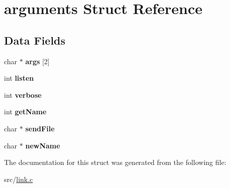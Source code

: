\hypertarget{structarguments}{}\section{arguments Struct Reference}
\label{structarguments}
\subsection*{Data Fields}
\begin{DoxyCompactItemize}
\item 
\hypertarget{structarguments_af17bdefc5e5a3d025f8f7cd9ac23b338}{}\label{structarguments_af17bdefc5e5a3d025f8f7cd9ac23b338} 
char $\ast$ {\bfseries args} \mbox{[}2\mbox{]}
\item 
\hypertarget{structarguments_a1656f07e9c1192c8a50c886a818ee8a1}{}\label{structarguments_a1656f07e9c1192c8a50c886a818ee8a1} 
int {\bfseries listen}
\item 
\hypertarget{structarguments_af26be46c71f5dceb1a990d05b926c7ec}{}\label{structarguments_af26be46c71f5dceb1a990d05b926c7ec} 
int {\bfseries verbose}
\item 
\hypertarget{structarguments_ae07d1497bbc944e8425443e698de60c6}{}\label{structarguments_ae07d1497bbc944e8425443e698de60c6} 
int {\bfseries get\+Name}
\item 
\hypertarget{structarguments_a89841ea8312d2413358efc516e9f9fa4}{}\label{structarguments_a89841ea8312d2413358efc516e9f9fa4} 
char $\ast$ {\bfseries send\+File}
\item 
\hypertarget{structarguments_a9ba9beaea6d0b6e3812e97df7cc93a15}{}\label{structarguments_a9ba9beaea6d0b6e3812e97df7cc93a15} 
char $\ast$ {\bfseries new\+Name}
\end{DoxyCompactItemize}


The documentation for this struct was generated from the following file\+:\begin{DoxyCompactItemize}
\item 
src/\hyperlink{link_8c}{link.\+c}\end{DoxyCompactItemize}
